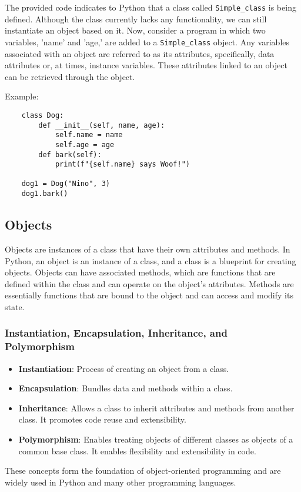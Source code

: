\documentclass{article}
\begin{document}
The provided code indicates to Python that a class called \texttt{Simple\_class} is being defined. Although the class currently lacks any functionality, we can still instantiate an object based on it.
Now, consider a program in which two variables, 'name' and 'age,' are added to a \texttt{Simple\_class} object. Any variables associated with an object are referred to as its attributes, specifically, data attributes or, at times, instance variables. These attributes linked to an object can be retrieved through the object.

    Example:
    \begin{verbatim}
    class Dog:
        def __init__(self, name, age):
            self.name = name
            self.age = age
        def bark(self):
            print(f"{self.name} says Woof!")
    
    dog1 = Dog("Nino", 3)
    dog1.bark()
    \end{verbatim}

\subsection{Objects}
Objects are instances of a class that have their own attributes and methods. In Python, an object is an instance of a class, and a class is a blueprint for creating objects. Objects can have associated methods, which are functions that are defined within the class and can operate on the object's attributes.
Methods are essentially functions that are bound to the object and can access and modify its state.

\subsubsection{Instantiation, Encapsulation, Inheritance, and Polymorphism}
\begin{itemize}
    \item \textbf{Instantiation}: Process of creating an object from a class.
    \item \textbf{Encapsulation}: Bundles data and methods within a class.
    \item \textbf{Inheritance}: Allows a class to inherit attributes and methods from another class. It promotes code reuse and extensibility.
    \item \textbf{Polymorphism}: Enables treating objects of different classes as objects of a common base class. It enables flexibility and extensibility in code.
\end{itemize}
These concepts form the foundation of object-oriented programming and are widely used in Python and many other programming languages.
\end{document}
